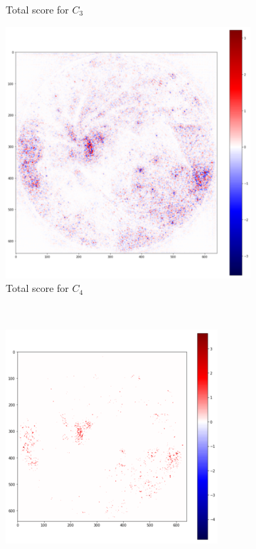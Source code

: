 \documentclass[preprint]{elsarticle}
\theoremstyle{definition} %
\theoremstyle{remark}
\begin{document}
\begin{figure}[h!]
\begin{subfigure}[b]{0.43\textwidth}
		\caption{Total score for $C_3$}
		\label{fig:score_total_c3}
	\end{subfigure}
	\begin{subfigure}[b]{0.43\textwidth}
		\includegraphics[width=\textwidth]{figures/score_prop_23713_left/score_total_c4.png}
		\caption{Total score for $C_4$}
		\label{fig:score_total_c4}
	\end{subfigure}~
	\begin{subfigure}[b]{0.43\textwidth}
		\includegraphics[width=\textwidth]{figures/score_prop_23713_left/score_total_c4_2std.png}

\end{subfigure}
\end{figure}
\end{document}

